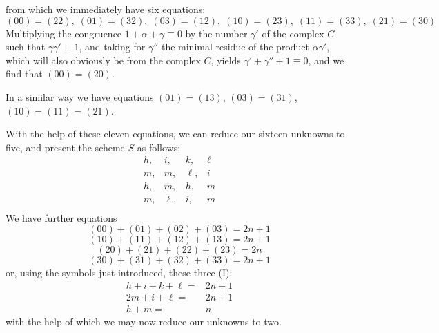 \documentclass{book}
\theoremstyle{plain}
\theoremstyle{remark}
\begin{document}
from which we immediately have six equations:
\[ (00)=(22),\; (01)=(32),\; (03)=(12), \;(10)=(23), \;(11) = (33), \;(21)=(30) \]
Multiplying the congruence $1 + \alpha + \gamma \equiv 0$ by the number $\gamma'$ of the complex $C$
such that $\gamma\gamma'\equiv 1$, and taking for $\gamma''$ the minimal residue of the product $\alpha\gamma'$, which will also obviously be from the complex $C$, yields $\gamma' + \gamma''+1 \equiv 0$, and we find that $(00) = (20)$. 

In a similar way we have equations $(01)=(13)$, $(03)=(31)$, $(10)=(11)=(21)$. 

With the help of these eleven equations, we can reduce our sixteen unknowns to five, and present the scheme $S$ as follows:
\[ \begin{array}{llll}
h,&i,&k,&\ell\\
m,&m,&\ell,&i\\
h,&m,&h,&m\\
m,&\ell,&i,&m\\
\end{array} \]
We have further equations
\[ (00) + (01) + (02) + (03) = 2n+1 \]
\[ (10)+(11)+(12) + (13) = 2n+1 \]
\[ (20)+(21)+(22) + (23) = 2n \]
\[ (30)+(31)+(32) + (33) = 2n+1 \]
or, using the symbols just introduced, these three (I):
\begin{align*}
 h+ i + k + \ell =& 2n+1 \\
 2m+i+\ell =& 2n+1 \\
 h+m =& n 
\end{align*}
 with the help of which we may now reduce our unknowns to two.  
 
\end{document}
